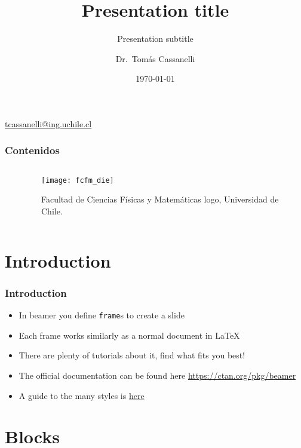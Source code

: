 \documentclass[
    10pt,
    aspectratio=169,
    xcolor={dvipsnames},
    spanish,
    ]{beamer}
\title[EL3103]{\bfseries Presentation title}
\subtitle{Presentation subtitle}
\author[Cassanelli]{Dr.~Tomás Cassanelli}
\institute[UChile]{Department of Electrical Engineering \\ Universidad de Chile}
\date{\today}
\begin{document}
\begin{frame}
  \titlepage
  \centering
   \href{mailto:tcassanelli@ing.uchile.cl}{tcassanelli@ing.uchile.cl} \hspace{.2cm}
\end{frame}

\begin{frame}
  \frametitle{Contenidos}
  \centering
  \begin{columns}
    \begin{column}{0.4\textwidth}
      \tableofcontents
    \end{column}
    \begin{column}{0.5\textwidth}
      \begin{figure}
        \centering
        \texttt{[image: fcfm\_die]}
        \caption{Facultad de Ciencias Físicas y Matemáticas logo, Universidad de Chile.}
      \end{figure}
    \end{column}
  \end{columns}  
\end{frame}

\section{Introduction}

\begin{frame}
  \frametitle{Introduction}
  \begin{itemize}
    \item In beamer you define \texttt{frame}s to create a slide
    \item Each frame works similarly as a normal document in \LaTeX
    \item There are plenty of tutorials about it, find what fits you best! 
    \item The official documentation can be found here \url{https://ctan.org/pkg/beamer}
    \item A guide to the many styles is \href{https://web.mit.edu/rsi/www/pdfs/beamer-tutorial.pdf}{here}
  \end{itemize}
\end{frame}

\section{Blocks}
\end{document}
